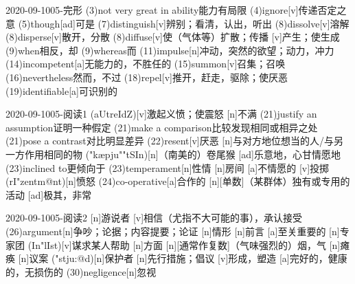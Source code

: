 \documentclass[12pt]{ctexart}
\begin{document}
\begin{wordlist}{2020-09-10}{05-完形}
  \word(3){not very great in ability}{能力有局限}
  \word(4){ignore}[v]{传递否定之意}
  \word(5){though}[ad]{可是}
  \word(7){distinguish}[v]{辨别；看清，认出，听出}
  \word(8){dissolve}[v]{溶解}
  \word[2020-09-17](8){disperse}[v]{散开，分散}
  \word[2020-10-16](8){diffuse}[v]{使（气体等）扩散；传播}
  [v]{产生；使生成}
  \word(9){when}{相反，却}
  \word(9){whereas}{而}
  \word(11){impulse}[n]{冲动，突然的欲望；动力，冲力}
  \word(14){incompetent}[a]{无能力的，不胜任的}
  \word(15){summon}[v]{召集；召唤}
  \word(16){nevertheless}{然而，不过}
  \word[2020-09-14](18){repel}[v]{推开，赶走，驱除；使厌恶}
  \word(19){identifiable}[a]{可识别的}
\end{wordlist}
\begin{wordlist}{2020-09-10}{05-阅读1}
  (aUtreIdZ)[v]{激起义愤；使震怒}
  [n]{不满}
  \word(21){justify an assumption}{证明一种假定}
  \word(21){make a comparison}{比较发现相同或相异之处}
  \word(21){pose a contrast}{对比明显差异}
  \word[2020-09-12](22){resent}[v]{厌恶}
  [n]{与对方地位想当的人/与另一方作用相同的物}
  ("k\ae pju""tSIn)[n]{（南美的）卷尾猴}
  [ad]{乐意地，心甘情愿地}
  \word(23){inclined to}{更倾向于}
  \word[2020-09-12](23){temperament}[n]{性情}
  [n]{房间}
  [a]{不情愿的}
  [v]{投掷}
  (rI"zentm@nt)[n]{愤怒}
  \word(24){co-operative}[a]{合作的}
  [n]{[单数]（某群体）独有或专用的活动}
  [ad]{极其，非常}
\end{wordlist}
\begin{wordlist}{2020-09-10}{05-阅读2}
  [n]{游说者}
  [v]{相信（尤指不大可能的事），承认接受}
  \word(26){argument}[n]{争吵；论据；内容提要；论证}
  [n]{情形}
  [n]{前言}
  [a]{至关重要的}
  [n]{专家团}
  (In"lIst)[v]{谋求某人帮助}
  [n]{方面}
  [n]{[通常作复数]（气味强烈的）烟，气}
  [n]{瘫痪}
  [n]{议案}
  ("stju:@d)[n]{保护者}
  [n]{先行措施；倡议}
  [v]{形成，塑造}
  [a]{完好的，健康的，无损伤的}
  \word[2020-09-27](30){negligence}[n]{忽视}
\end{wordlist}
\end{document}
